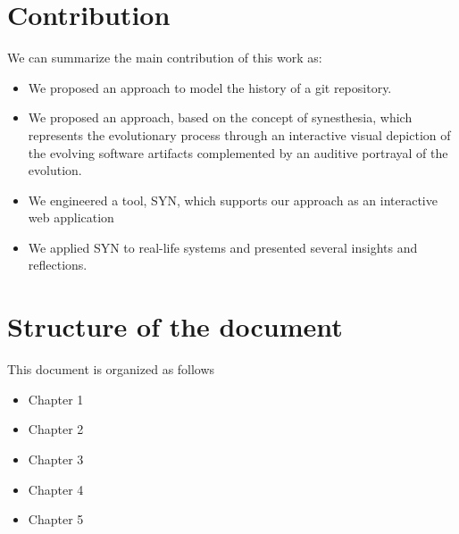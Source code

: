 \section{Contribution}
We can summarize the main contribution of this work as:
\begin{itemize}
 \item We proposed an approach to model the history of a git repository.
 \item We proposed an approach,  based on the concept of synesthesia, which represents the evolutionary process through an interactive visual depiction of the evolving software artifacts complemented by an auditive portrayal of the evolution.
 \item We engineered a tool, SYN, which supports our approach as an interactive web application
 \item We applied SYN to real-life systems and presented several insights and reflections. 
\end{itemize}

\section{Structure of the document}
This document is organized as follows
\begin{itemize}
 \item {Chapter 1}
 \item {Chapter 2}
 \item {Chapter 3}
 \item {Chapter 4}
 \item {Chapter 5}

\end{itemize}